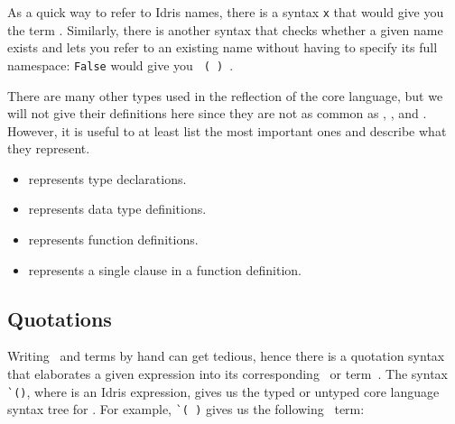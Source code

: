 As a quick way to refer to Idris names, there is a syntax
\texttt{\IdrisKeyword{\`{}\{\{}x\IdrisKeyword{\}\}}}
that would give you the term  .
Similarly, there is another syntax that checks whether a given name exists and
lets you refer to an existing name without having to specify its full
namespace: \texttt{\IdrisKeyword{\`{}\{}False\IdrisKeyword{\}}} would give you
\texttt{ ( ) }.

\medskip

There are many other types used in the reflection of the core language, but we
will not give their definitions here since they are not as common as \TT,
, and . However, it is useful to at least list the most
important ones and describe what they represent.

\begin{itemize}
\item{} represents type declarations.
\item{} represents data type definitions.
\item{} represents function definitions.
\item{} represents a single clause in a function definition.
\end{itemize}

\subsection{Quotations}\label{ssec:quotation}

Writing \TT\ and  terms by hand can get tedious, hence there is a
quotation syntax that elaborates a given expression into its corresponding
\TT\ or  term~\cite{idrisQuotation}.
The syntax \texttt{\`{}()}, where  is an Idris expression, gives
us the typed or untyped core language syntax tree for . For example,
\texttt{\`{}( )} gives us the following \TT\ term:

